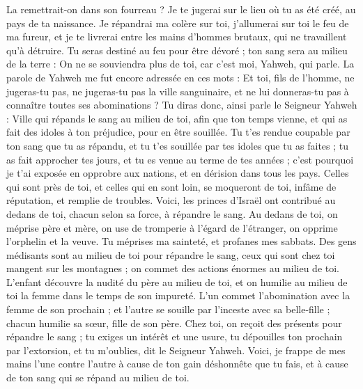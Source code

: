 \begin{multicols}{2}
La remettrait-on dans son fourreau ? Je te jugerai sur le lieu où tu as été créé, au pays de ta naissance.
Je répandrai ma colère sur toi, j'allumerai sur toi le feu de ma fureur, et je te livrerai entre les mains d'hommes brutaux, qui ne travaillent qu'à détruire.
Tu seras destiné au feu pour être dévoré ; ton sang sera au milieu de la terre : On ne se souviendra plus de toi, car c'est moi, Yahweh, qui parle.
\VerseOne{}La parole de Yahweh me fut encore adressée en ces mots :
Et toi, fils de l'homme, ne jugeras-tu pas, ne jugeras-tu pas la ville sanguinaire, et ne lui donneras-tu pas à connaître toutes ses abominations ?
Tu diras donc, ainsi parle le Seigneur Yahweh : Ville qui répands le sang au milieu de toi, afin que ton temps vienne, et qui as fait des idoles à ton préjudice, pour en être souillée.
Tu t'es rendue coupable par ton sang que tu as répandu, et tu t'es souillée par tes idoles que tu as faites ; tu as fait approcher tes jours, et tu es venue au terme de tes années ; c'est pourquoi je t'ai exposée en opprobre aux nations, et en dérision dans tous les pays.
Celles qui sont près de toi, et celles qui en sont loin, se moqueront de toi, infâme de réputation, et remplie de troubles.
Voici, les princes d'Israël ont contribué au dedans de toi, chacun selon sa force, à répandre le sang.
Au dedans de toi, on méprise père et mère, on use de tromperie à l'égard de l'étranger, on opprime l'orphelin et la veuve.
Tu méprises ma sainteté, et profanes mes sabbats.
Des gens médisants sont au milieu de toi pour répandre le sang, ceux qui sont chez toi mangent sur les montagnes ; on commet des actions énormes au milieu de toi.
L'enfant découvre la nudité du père au milieu de toi, et on humilie au milieu de toi la femme dans le temps de son impureté.
L'un commet l'abomination avec la femme de son prochain ; et l'autre se souille par l'inceste avec sa belle-fille ; chacun humilie sa sœur, fille de son père.
Chez toi, on reçoit des présents pour répandre le sang ; tu exiges un intérêt et une usure, tu dépouilles ton prochain par l'extorsion, et tu m'oublies, dit le Seigneur Yahweh.
Voici, je frappe de mes mains l'une contre l'autre à cause de ton gain déshonnête que tu fais, et à cause de ton sang qui se répand au milieu de toi.

\end{multicols}
